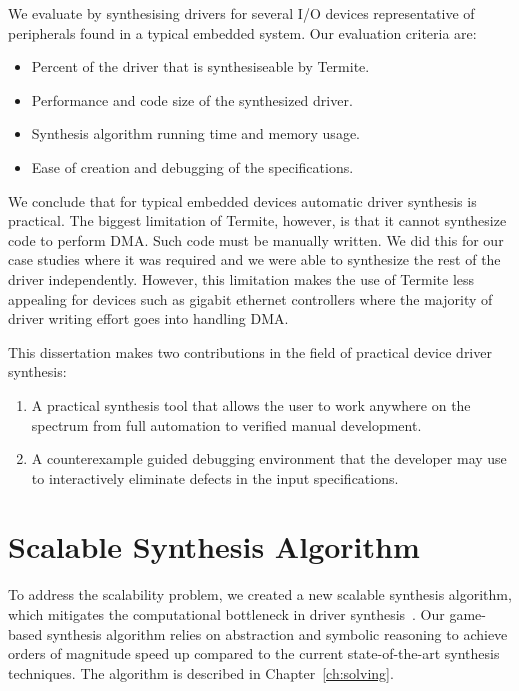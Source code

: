 We evaluate \termite by synthesising drivers for several I/O devices representative of peripherals found in a typical embedded system. Our evaluation criteria are:
\begin{itemize}
    \item Percent of the driver that is synthesiseable by Termite.
    \item Performance and code size of the synthesized driver.
    \item Synthesis algorithm running time and memory usage.
    \item Ease of creation and debugging of the specifications.
\end{itemize}

We conclude that for typical embedded devices automatic driver synthesis is practical. The biggest limitation of Termite, however, is that it cannot synthesize code to perform DMA. Such code must be manually written. We did this for our case studies where it was required and we were able to synthesize the rest of the driver independently. However, this limitation makes the use of Termite less appealing for devices such as gigabit ethernet controllers where the majority of driver writing effort goes into handling DMA.

This dissertation makes two contributions in the field of practical device driver synthesis:
\begin{enumerate}
    \item A practical synthesis tool that allows the user to work anywhere on the spectrum from full automation to verified manual development.
    \item A counterexample guided debugging environment that the developer may use to interactively eliminate defects in the input specifications.
\end{enumerate}

\section{Scalable Synthesis Algorithm}
\label{sec:scalable_synth}

To address the scalability problem, we created a new scalable synthesis algorithm, which mitigates the computational bottleneck in driver synthesis~\cite{Walker_Ryzhyk_14}. Our game-based synthesis algorithm relies on abstraction and symbolic reasoning to achieve orders of magnitude speed up compared to the current state-of-the-art synthesis techniques.  The algorithm is described in Chapter~\ref{ch:solving}.

